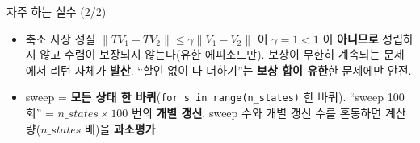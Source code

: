 \begin{frame}{자주 하는 실수 (2/2)}
  \begin{itemize}
    \item {} 축소 사상
      성질 $\|TV_1 - TV_2\| \le \gamma \|V_1 - V_2\|$ 이
      $\gamma = 1 < 1$ 이 \textbf{아니므로} 성립하지 않고
      수렴이 보장되지 않는다(유한 에피소드만). 보상이 무한히
      계속되는 문제에서 리턴 자체가 \textbf{발산}. ``할인 없이
      다 더하기''는 \textbf{보상 합이 유한}한 문제에만 안전.
    \item {}
      sweep = \textbf{모든 상태 한 바퀴}(\texttt{for s in
      range(n\_states)} 한 바퀴). ``sweep 100회'' =
      $n\_states \times 100$ 번의 \textbf{개별 갱신}. sweep 수와
      개별 갱신 수를 혼동하면 계산량($n\_states$ 배)을
      \textbf{과소평가}.
  \end{itemize}
\end{frame}
